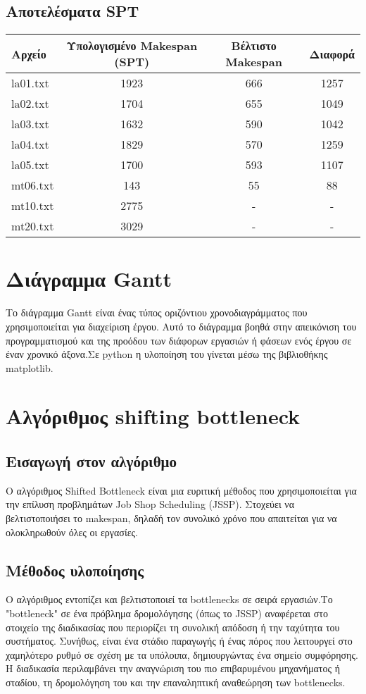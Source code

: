 \documentclass{article}
\begin{document}
\subsection{Αποτελέσματα SPT}

\begin{tabular}{ l c c c }
\hline
Αρχείο & Υπολογισμένο Makespan (SPT) & Βέλτιστο Makespan & Διαφορά \\
\hline
la01.txt & 1923 & 666 & 1257 \\
la02.txt & 1704 & 655 & 1049 \\
la03.txt & 1632 & 590 & 1042 \\
la04.txt & 1829 & 570 & 1259 \\
la05.txt & 1700 & 593 & 1107 \\
mt06.txt & 143 & 55 & 88 \\
mt10.txt & 2775 & - & - \\
mt20.txt & 3029 & - & - \\
\hline
\end{tabular}



\section{Διάγραμμα Gantt}

Το διάγραμμα Gantt είναι ένας τύπος οριζόντιου χρονοδιαγράμματος που χρησιμοποιείται για διαχείριση έργου. Αυτό το διάγραμμα βοηθά στην απεικόνιση του προγραμματισμού και της προόδου των διάφορων εργασιών ή φάσεων ενός έργου σε έναν χρονικό άξονα.Σε python η υλοποίηση του γίνεται μέσω της βιβλιοθήκης matplotlib.



\section{Αλγόριθμος shifting bottleneck}
\vspace{0.2cm}

\subsection{Εισαγωγή στον αλγόριθμο}
Ο αλγόριθμος Shifted Bottleneck είναι μια ευριτική μέθοδος που χρησιμοποιείται για την επίλυση προβλημάτων Job Shop Scheduling (JSSP). Στοχεύει να βελτιστοποιήσει το makespan, δηλαδή τον συνολικό χρόνο που απαιτείται για να ολοκληρωθούν όλες οι εργασίες.

\subsection{Μέθοδος υλοποίησης}
Ο αλγόριθμος εντοπίζει και βελτιστοποιεί τα bottlenecks σε σειρά εργασιών.Το "bottleneck" σε ένα πρόβλημα δρομολόγησης (όπως το JSSP) αναφέρεται στο στοιχείο της διαδικασίας που περιορίζει τη συνολική απόδοση ή την ταχύτητα του συστήματος. Συνήθως, είναι ένα στάδιο παραγωγής ή ένας πόρος που λειτουργεί στο χαμηλότερο ρυθμό σε σχέση με τα υπόλοιπα, δημιουργώντας ένα σημείο συμφόρησης. Η διαδικασία περιλαμβάνει την αναγνώριση του πιο επιβαρυμένου μηχανήματος ή σταδίου, τη δρομολόγηση του και την επαναληπτική αναθεώρηση των bottlenecks.
\end{document}
